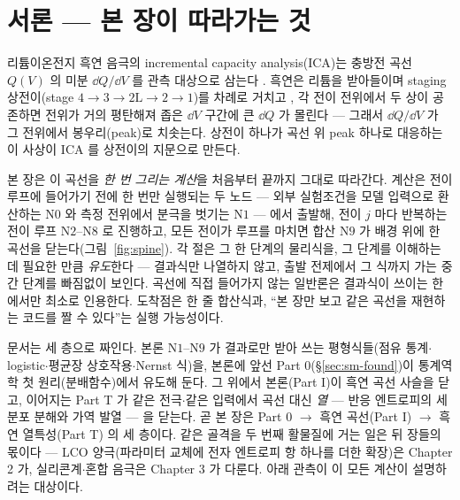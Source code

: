 \section*{서론 --- 본 장이 따라가는 것}

리튬이온전지 흑연 음극의 incremental capacity analysis(ICA)는 충방전 곡선 $Q(V)$ 의 미분
$\dd Q/\dd V$ 를 관측 대상으로 삼는다 \cite{bloom2005,dubarry2012}. 흑연은 리튬을 받아들이며 staging
상전이(stage $4\!\to\!3\!\to\!2\mathrm L\!\to\!2\!\to\!1$)를 차례로 거치고 \cite{dahn1991,ohzuku1993}, 각 전이
전위에서 두 상이 공존하면 전위가 거의 평탄해져 좁은 $\dd V$ 구간에 큰 $\dd Q$ 가 몰린다 --- 그래서
$\dd Q/\dd V$ 가 그 전위에서 봉우리(peak)로 치솟는다. 상전이 하나가 곡선 위 peak 하나로 대응하는 이
사상이 ICA 를 상전이의 지문으로 만든다.

본 장은 이 곡선을 \emph{한 번 그리는 계산}을 처음부터 끝까지 그대로 따라간다. 계산은 전이 루프에 들어가기 전에
한 번만 실행되는 두 노드 --- 외부 실험조건을 모델 입력으로 환산하는 $\mathrm N0$ 와 측정 전위에서 분극을 벗기는
$\mathrm N1$ --- 에서 출발해, 전이 $j$ 마다 반복하는 전이 루프 $\mathrm N2$--$\mathrm N8$ 로 진행하고,
모든 전이가 루프를 마치면 합산 $\mathrm N9$ 가 배경 위에 한 곡선을 닫는다(그림~\ref{fig:spine}). 각 절은 그 한 단계의 물리식을, 그 단계를
이해하는 데 필요한 만큼 \emph{유도}한다 --- 결과식만 나열하지 않고, 출발 전제에서 그 식까지 가는 중간
단계를 빠짐없이 보인다. 곡선에 직접 들어가지 않는 일반론은 결과식이 쓰이는 한에서만 최소로 인용한다.
도착점은 한 줄 합산식과, ``본 장만 보고 같은 곡선을 재현하는 코드를 짤 수 있다''는 실행 가능성이다.

문서는 세 층으로 짜인다. 본론 $\mathrm N1$--$\mathrm N9$ 가 결과로만 받아 쓰는 평형식들(점유 통계$\cdot$
logistic$\cdot$평균장 상호작용$\cdot$Nernst 식)을, 본론에 앞선 Part 0(\S\ref{sec:sm-found})이 통계역학 첫
원리(분배함수)에서 유도해 둔다. 그 위에서 본론(Part I)이 흑연 곡선 사슬을 닫고, 이어지는 Part T 가 같은
전극$\cdot$같은 입력에서 곡선 대신 \emph{열} --- 반응 엔트로피의 세 분포 분해와 가역 발열 --- 을 닫는다.
곧 본 장은 Part 0 $\to$ 흑연 곡선(Part I) $\to$ 흑연 열특성(Part T) 의 세 층이다. 같은 골격을 두 번째
활물질에 거는 일은 뒤 장들의 몫이다 --- LCO 양극(파라미터 교체에 전자 엔트로피 항 하나를 더한 확장)은
Chapter 2 가, 실리콘계$\cdot$혼합 음극은 Chapter 3 가 다룬다. 아래 관측이 이 모든 계산이 설명하려는 대상이다.

